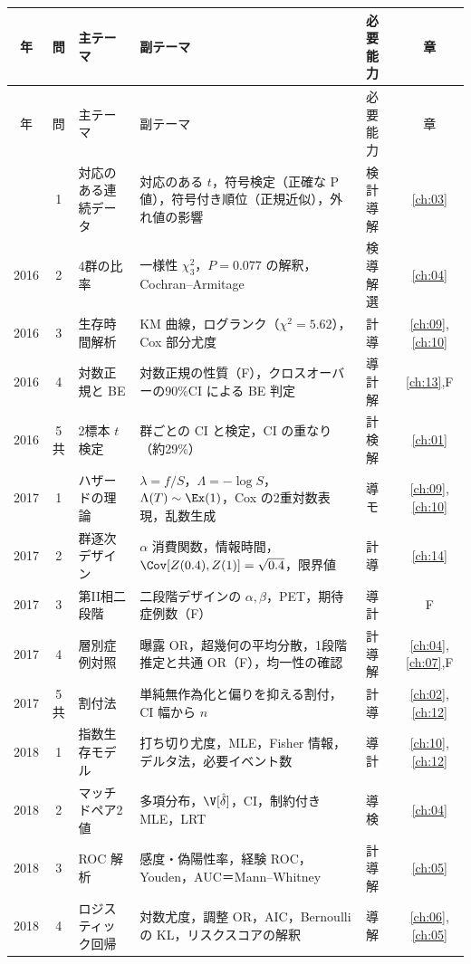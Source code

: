 \begin{center}\scriptsize
\setlength{\tabcolsep}{3pt}
\begin{longtable}{@{}ccL{36mm}L{58mm}L{16mm}c@{}}
\toprule
年 & 問 & 主テーマ & 副テーマ & 必要能力 & 章\\
\midrule
\endfirsthead
\toprule
年 & 問 & 主テーマ & 副テーマ & 必要能力 & 章\\
\midrule
\endhead
\bottomrule
{} & 1 & 対応のある連続データ & 対応のある $t$，符号検定（正確な P 値），符号付き順位（正規近似），外れ値の影響 & 検 計 導 解 & \ref{ch:03}\\
2016 & 2 & 4群の比率 & 一様性 $\chi^2_3$，$P=0.077$ の解釈，Cochran--Armitage & 検 導 解 選 & \ref{ch:04}\\
2016 & 3 & 生存時間解析 & KM 曲線，ログランク（$\chi^2=5.62$），Cox 部分尤度 & 計 導 & \ref{ch:09},\ref{ch:10}\\
2016 & 4 & 対数正規と BE & 対数正規の性質（F），クロスオーバーの90\%CI による BE 判定 & 導 計 解 & \ref{ch:13},F\\
2016 & 5共 & 2標本 $t$ 検定 & 群ごとの CI と検定，CI の重なり（約29\%） & 計 検 解 & \ref{ch:01}\\
2017 & 1 & ハザードの理論 & $\lambda=f/S$，$\Lambda=-\log S$，$\Lambda(T)\sim\Ex(1)$，Cox の2重対数表現，乱数生成 & 導 モ & \ref{ch:09},\ref{ch:10}\\
2017 & 2 & 群逐次デザイン & $\alpha$ 消費関数，情報時間，$\Cov[Z(0.4),Z(1)]=\sqrt{0.4}$，限界値 & 計 導 & \ref{ch:14}\\
2017 & 3 & 第II相二段階 & 二段階デザインの $\alpha,\beta$，PET，期待症例数（F） & 導 計 & F\\
2017 & 4 & 層別症例対照 & 曝露 OR，超幾何の平均分散，1段階推定と共通 OR（F），均一性の確認 & 計 導 解 & \ref{ch:04},\ref{ch:07},F\\
2017 & 5共 & 割付法 & 単純無作為化と偏りを抑える割付，CI 幅から $n$ & 計 導 & \ref{ch:02},\ref{ch:12}\\
2018 & 1 & 指数生存モデル & 打ち切り尤度，MLE，Fisher 情報，デルタ法，必要イベント数 & 導 計 & \ref{ch:10},\ref{ch:12}\\
2018 & 2 & マッチドペア2 値 & 多項分布，$\V[\hat\delta]$，CI，制約付き MLE，LRT & 導 検 & \ref{ch:04}\\
2018 & 3 & ROC 解析 & 感度・偽陽性率，経験 ROC，Youden，AUC＝Mann--Whitney & 計 導 解 & \ref{ch:05}\\
2018 & 4 & ロジスティック回帰 & 対数尤度，調整 OR，AIC，Bernoulli の KL，リスクスコアの解釈 & 導 解 & \ref{ch:06},\ref{ch:05}\\

\end{longtable}
\end{center}
